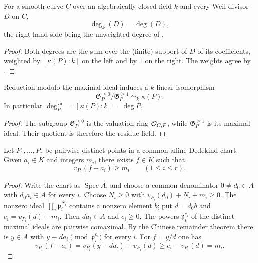 \begin{corollary}
  \label{cor:adelic_degK_eq_degree}
  \leanok
  For a smooth curve \(C\) over an algebraically closed field \(k\) and every
  Weil divisor \(D\) on \(C\),
  \[
    \deg_k(D) = \deg(D),
  \]
  the right-hand side being the unweighted degree of .
\end{corollary}
\begin{proof}
  \leanok
  Both degrees are the sum over the (finite) support of \(D\) of its
  coefficients, weighted by \([\kappa(P):k]\) on the left and by \(1\) on the
  right. The weights agree by .
\end{proof}

\begin{lemma}
  \label{lem:adelic_valuation_quotient_residue_field}
  Reduction modulo the maximal ideal induces a \(k\)-linear isomorphism
  \[
    \mathfrak G_P^{\ge0}/\mathfrak G_P^{\ge1}\simeq_k\kappa(P).
  \]
  In particular \(\deg_P^{\mathrm{val}}=[\kappa(P):k]=\deg P\).
\end{lemma}
\begin{proof}
  The subgroup \(\mathfrak G_P^{\ge0}\) is the valuation ring
  \(\mathcal{O}_{C,P}\), while \(\mathfrak G_P^{\ge1}\) is its maximal ideal.
  Their quotient is therefore the residue field.
\end{proof}

\begin{theorem}
  \label{thm:adelic_weak_approximation}
  Let \(P_1,\ldots,P_r\) be pairwise distinct points in a common affine
  Dedekind chart.  Given \(a_i\in K\) and integers \(m_i\), there exists
  \(f\in K\) such that
  \[
    v_{P_i}(f-a_i)\geq m_i\qquad(1\leq i\leq r).
  \]
\end{theorem}
\begin{proof}
  Write the chart as \(\operatorname{Spec}A\), and choose a common
  denominator \(0\ne d_0\in A\) with \(d_0a_i\in A\) for every \(i\).
  Choose \(N_i\geq0\) with
  \(v_{P_i}(d_0)+N_i+m_i\geq0\).  The nonzero ideal
  \(\prod_i\mathfrak p_i^{N_i}\) contains a nonzero element \(b\); put
  \(d=d_0b\) and \(e_i=v_{P_i}(d)+m_i\).  Then \(da_i\in A\) and
  \(e_i\geq0\).  The powers
  \(\mathfrak p_i^{e_i}\) of the distinct maximal ideals are pairwise
  comaximal.  By the Chinese remainder theorem there is \(y\in A\) with
  \(y\equiv da_i\pmod{\mathfrak p_i^{e_i}}\) for every \(i\).  For
  \(f=y/d\) one has
  \[
    v_{P_i}(f-a_i)=v_{P_i}(y-da_i)-v_{P_i}(d)
      \geq e_i-v_{P_i}(d)=m_i.
  \]
\end{proof}

